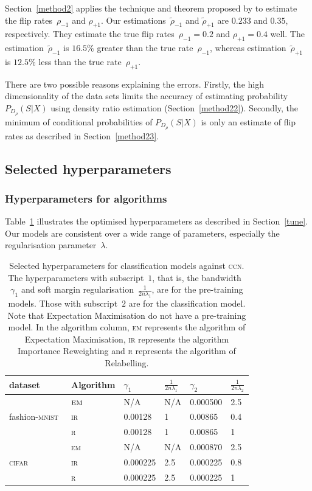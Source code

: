 \documentclass[12pt]{article} %
\newcommand{\rhoo}{\rho_{+1}}
\newcommand{\rhoz}{\rho_{-1}}
\newcommand{\mnist}{fashion-\textsc{mnist}}
\begin{document}
Section~\ref{method2} applies the technique and theorem proposed by \citet{liu2016classification} to estimate the flip rates~$\rhoz$ and $\rhoo$. Our estimations~$\tilde{\rho}_{-1}$ and $\tilde{\rho}_{+1}$ are $0.233$ and $0.35$, respectively. They estimate the true flip rates~$\rhoz=0.2$ and $\rhoo=0.4$ well. 
The estimation~$\tilde{\rho}_{-1}$ is $16.5\%$ greater than the true rate~$\rhoz$, whereas estimation~$\tilde{\rho}_{+1}$ is $12.5\%$ less than  the true rate~$\rhoo$.

There are two possible reasons explaining the errors. 
Firstly, the high dimensionality of the data sets limits the accuracy of estimating probability~$P_{D_\rho}(S|X)$ using density ratio estimation  (Section~\ref{method22}). 
Secondly, the minimum of conditional probabilities of $P_{D_\rho}(S|X)$ is only an estimate of flip rates as described in Section~\ref{method23}.


\subsection{Selected hyperparameters}
\subsubsection{Hyperparameters for algorithms}
Table~\ref{tab:hyperparameter} illustrates the optimised hyperparameters as described in Section~\ref{tune}. Our models are consistent over a wide range of parameters, especially the regularisation parameter~$\lambda$.
\begin{table}
	\caption{Selected hyperparameters for classification models against \textsc{ccn}. The hyperparameters with subscript~$1$, that is, the bandwidth~$\gamma_1$ and soft margin regularisation~$\frac{1}{2n\lambda_1}$, are for the pre-training models. Those with subscript~$2$ are for the classification model. Note that Expectation Maximisation do not have a pre-training model. In the algorithm column, \textsc{em} represents the algorithm of Expectation Maximisation, \textsc{ir} represents the algorithm Importance Reweighting and \textsc{r} represents the algorithm of Relabelling.}
	\label{tab:hyperparameter}
\centering
\begin{tabular}{@{}ll|ll|ll@{}}
\toprule
dataset& Algorithm&$\gamma_{1}$  &$\frac{1}{2n\lambda_{1}}$ &$\gamma_{2}$  & $\frac{1}{2n\lambda_{2}}$ \\ \midrule
&$\textsc{em}$& \textsc{N/A}     & \textsc{N/A}  &0.000500 &2.5              \\
\mnist\ &\textsc{ir}& 0.00128  & 1              & 0.00865    & 0.4\\
 & \textsc{r}& 0.00128 & 1             & 0.00865     & 1\\
\midrule
&\textsc{em}&\textsc{N/A}     & \textsc{N/A} & 0.000870 & 2.5       \\
 \textsc{cifar}&\textsc{ir}&0.000225 & 2.5              & 0.000225    & 0.8\\
   &\textsc{r}&0.000225 & 2.5           & 0.000225     & 1\\ 
\bottomrule
\end{tabular}
\end{table}
\end{document}
